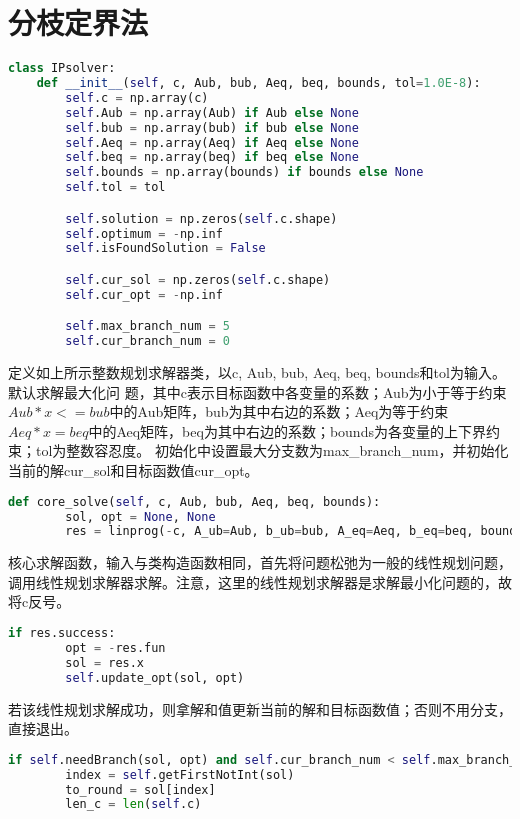 \section{分枝定界法}
\begin{lstlisting}[language=python]
	class IPsolver:
    def __init__(self, c, Aub, bub, Aeq, beq, bounds, tol=1.0E-8):
        self.c = np.array(c)
        self.Aub = np.array(Aub) if Aub else None
        self.bub = np.array(bub) if bub else None
        self.Aeq = np.array(Aeq) if Aeq else None
        self.beq = np.array(beq) if beq else None
        self.bounds = np.array(bounds) if bounds else None
        self.tol = tol

        self.solution = np.zeros(self.c.shape)
        self.optimum = -np.inf
        self.isFoundSolution = False

        self.cur_sol = np.zeros(self.c.shape)
        self.cur_opt = -np.inf

        self.max_branch_num = 5
        self.cur_branch_num = 0

\end{lstlisting}


定义如上所示整数规划求解器类，以c, Aub, bub, Aeq, beq, bounds和tol为输入。默认求解最大化问
题，其中c表示目标函数中各变量的系数；Aub为小于等于约束$Aub*x<=bub$中的Aub矩阵，bub为其中右边的系数；Aeq为等于约束$Aeq*x=beq$中的Aeq矩阵，beq为其中右边的系数；bounds为各变量的上下界约束；tol为整数容忍度。
初始化中设置最大分支数为max\_branch\_num，并初始化当前的解cur\_sol和目标函数值cur\_opt。

\begin{lstlisting}[language=python]
    def core_solve(self, c, Aub, bub, Aeq, beq, bounds):
        sol, opt = None, None
        res = linprog(-c, A_ub=Aub, b_ub=bub, A_eq=Aeq, b_eq=beq, bounds=bounds)
\end{lstlisting}

核心求解函数，输入与类构造函数相同，首先将问题松弛为一般的线性规划问题，调用线性规划求解器求解。注意，这里的线性规划求解器是求解最小化问题的，故将c反号。

\begin{lstlisting}[language=python]
	if res.success:
		opt = -res.fun
		sol = res.x
		self.update_opt(sol, opt)
\end{lstlisting}

若该线性规划求解成功，则拿解和值更新当前的解和目标函数值；否则不用分支，直接退出。

\begin{lstlisting}[language=python]
	if self.needBranch(sol, opt) and self.cur_branch_num < self.max_branch_num:
		index = self.getFirstNotInt(sol)
		to_round = sol[index]
		len_c = len(self.c)
\end{lstlisting}

